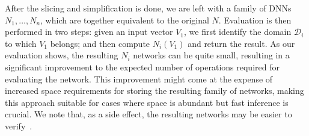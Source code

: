 \documentclass[10pt, conference, twocolumn, compsocconf]{IEEEtran}
\theoremstyle{remark}
\renewcommand{\paragraph}[1]{\vspace{1mm}\noindent{\bf #1}\ }
\newcommand{\guy}[1]{\marginpar{\textcolor{orange}{Guy: #1}}}
\begin{document}
  After the slicing and simplification is done, we are left with a
  family of DNNs $N_1,\ldots,N_n$, which are together equivalent to
  the original $N$.  Evaluation is then performed in two steps: given
  an input vector $V_1$, we first identify the domain $\mathcal{D}_i$
  to which $V_1$ belongs; and then compute $N_i(V_1)$ and return the
  result. As our evaluation shows, the resulting $N_i$ networks can be
  quite small, resulting in a significant improvement to the expected
  number of operations required for evaluating the network. This
  improvement might come at the expense of increased space
  requirements for storing the resulting family of networks, making
  this approach suitable for cases where space is abundant but fast
  inference is crucial.  We note that, as a side effect, the resulting
  networks may be easier to
  verify~\cite{WaPeWhYaJa18,WuOzZeIrJuGoFoKaPaBa20}.


%
%




\end{document}
